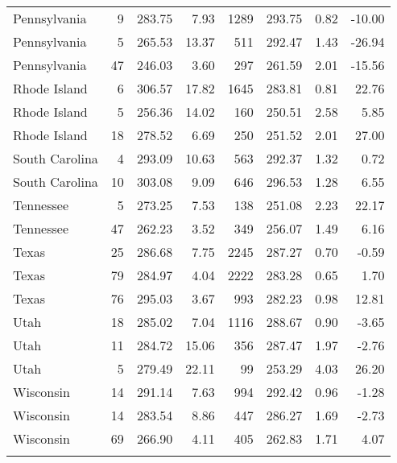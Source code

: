 \begin{longtable}{lrrr@{\extracolsep{10pt}}rrrr}
  Pennsylvania &   9 & 283.75 & 7.93 & 1289 & 293.75 & 0.82 & -10.00 \\ 
  Pennsylvania &   5 & 265.53 & 13.37 & 511 & 292.47 & 1.43 & -26.94 \\ 
  Pennsylvania &  47 & 246.03 & 3.60 & 297 & 261.59 & 2.01 & -15.56 \\ 
  Rhode Island &   6 & 306.57 & 17.82 & 1645 & 283.81 & 0.81 & 22.76 \\ 
  Rhode Island &   5 & 256.36 & 14.02 & 160 & 250.51 & 2.58 & 5.85 \\ 
  Rhode Island &  18 & 278.52 & 6.69 & 250 & 251.52 & 2.01 & 27.00 \\ 
  South Carolina &   4 & 293.09 & 10.63 & 563 & 292.37 & 1.32 & 0.72 \\ 
  South Carolina &  10 & 303.08 & 9.09 & 646 & 296.53 & 1.28 & 6.55 \\ 
  Tennessee &   5 & 273.25 & 7.53 & 138 & 251.08 & 2.23 & 22.17 \\ 
  Tennessee &  47 & 262.23 & 3.52 & 349 & 256.07 & 1.49 & 6.16 \\ 
  Texas &  25 & 286.68 & 7.75 & 2245 & 287.27 & 0.70 & -0.59 \\ 
  Texas &  79 & 284.97 & 4.04 & 2222 & 283.28 & 0.65 & 1.70 \\ 
  Texas &  76 & 295.03 & 3.67 & 993 & 282.23 & 0.98 & 12.81 \\ 
  Utah &  18 & 285.02 & 7.04 & 1116 & 288.67 & 0.90 & -3.65 \\ 
  Utah &  11 & 284.72 & 15.06 & 356 & 287.47 & 1.97 & -2.76 \\ 
  Utah &   5 & 279.49 & 22.11 &  99 & 253.29 & 4.03 & 26.20 \\ 
  Wisconsin &  14 & 291.14 & 7.63 & 994 & 292.42 & 0.96 & -1.28 \\ 
  Wisconsin &  14 & 283.54 & 8.86 & 447 & 286.27 & 1.69 & -2.73 \\ 
  Wisconsin &  69 & 266.90 & 4.11 & 405 & 262.83 & 1.71 & 4.07 \\ 
   \hline
\hline
\label{g8mathlraiclevel1}
\end{longtable}
